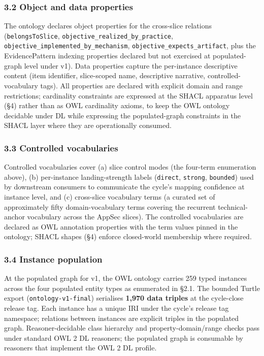 \documentclass[
]{article}
\begin{document}
\subsubsection{3.2 Object and data
properties}\label{object-and-data-properties}

The ontology declares object properties for the cross-slice relations
(\texttt{belongsToSlice}, \texttt{objective\_realized\_by\_practice},
\texttt{objective\_implemented\_by\_mechanism},
\texttt{objective\_expects\_artifact}, plus the EvidencePattern indexing
properties declared but not exercised at populated-graph level under
v1). Data properties capture the per-instance descriptive content (item
identifier, slice-scoped name, descriptive narrative,
controlled-vocabulary tags). All properties are declared with explicit
domain and range restrictions; cardinality constraints are expressed at
the SHACL apparatus level (§4) rather than as OWL cardinality axioms, to
keep the OWL ontology decidable under DL while expressing the
populated-graph constraints in the SHACL layer where they are
operationally consumed.

\subsubsection{3.3 Controlled
vocabularies}\label{controlled-vocabularies}

Controlled vocabularies cover (a) slice control modes (the four-term
enumeration above), (b) per-instance landing-strength labels
(\texttt{direct}, \texttt{strong}, \texttt{bounded}) used by downstream
consumers to communicate the cycle's mapping confidence at instance
level, and (c) cross-slice vocabulary terms (a curated set of
approximately fifty domain-vocabulary terms covering the recurrent
technical-anchor vocabulary across the AppSec slices). The controlled
vocabularies are declared as OWL annotation properties with the term
values pinned in the ontology; SHACL shapes (§4) enforce closed-world
membership where required.

\subsubsection{3.4 Instance population}\label{instance-population}

At the populated graph for v1, the OWL ontology carries 259 typed
instances across the four populated entity types as enumerated in §2.1.
The bounded Turtle export (\texttt{ontology-v1-final}) serialises
\textbf{1,970 data triples} at the cycle-close release tag. Each
instance has a unique IRI under the cycle's release tag namespace;
relations between instances are explicit triples in the populated graph.
Reasoner-decidable class hierarchy and property-domain/range checks pass
under standard OWL 2 DL reasoners; the populated graph is consumable by
reasoners that implement the OWL 2 DL profile.
\end{document}
